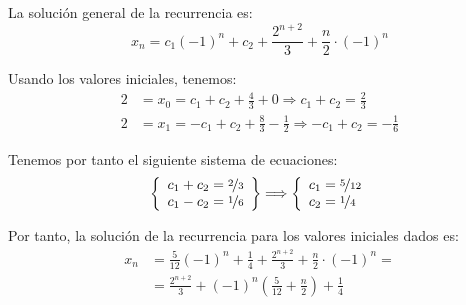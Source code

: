 \begin{ejercicio}
    La solución general de la recurrencia es:
    \begin{equation*}
        x_n = c_1(-1)^n + c_2 + \frac{2^{n+2}}{3} + \frac{n}{2}\cdot (-1)^n
    \end{equation*}

    Usando los valores iniciales, tenemos:
    \begin{align*}
        2 &= x_0 = c_1 + c_2 + \frac{4}{3} + 0 \Longrightarrow c_1 + c_2 = \frac{2}{3} \\
        2 &= x_1 = -c_1 + c_2 + \frac{8}{3} - \frac{1}{2} \Longrightarrow -c_1 + c_2 = -\frac{1}{6}
    \end{align*}

    Tenemos por tanto el siguiente sistema de ecuaciones:
    \begin{equation*}
        \left\{\begin{array}{l}
            c_1 + c_2 = \nicefrac{2}{3} \\
            c_1 - c_2 = \nicefrac{1}{6}
        \end{array}\right\}
        \Longrightarrow
        \left\{\begin{array}{l}
            c_1 = \nicefrac{5}{12} \\
            c_2 = \nicefrac{1}{4}
        \end{array}\right.
    \end{equation*}

    Por tanto, la solución de la recurrencia para los valores iniciales dados es:
    \begin{align*}
        x_n &= \frac{5}{12}(-1)^n + \frac{1}{4} + \frac{2^{n+2}}{3} + \frac{n}{2}\cdot (-1)^n =\\
        &= \frac{2^{n+2}}{3} + (-1)^n\left(\frac{5}{12} + \frac{n}{2}\right) + \frac{1}{4}
    \end{align*}
\end{ejercicio}


